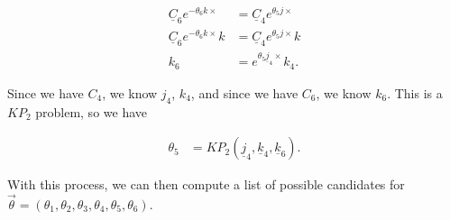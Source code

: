 \documentclass[11pt]{article}
\begin{document}
\begin{align*}
    \underline{C}_6 e^{-\theta_6 k\times } &= \underline{C}_4 e^{\theta_5 j\times }\\
    \underline{C}_6 e^{-\theta_6 k\times } k &= \underline{C}_4 e^{\theta_{5} j \times } k \\
    k_6 &= e^{\theta_5 \underline{j}_4 \times } k_4
.\end{align*}

Since we have $C_4$, we know $j_4$, $k_4$, and since we have $C_6$, we know $k_6$.
This is a $KP_2$ problem, so we have

\begin{align}
\theta_5 &= KP_2 (\underline{j}_4,\underline{k}_4,\underline{k}_6)
.\end{align}

With this process, we can then compute a list of possible candidates for $\vec{\theta} = (\theta_1, \theta_2, \theta_3, \theta_4, \theta_5, \theta_6)$.
\end{document}
